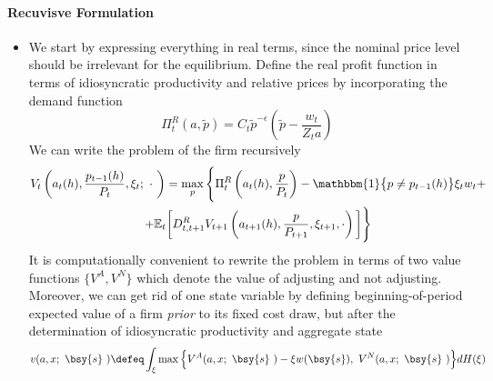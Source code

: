 \documentclass[a4paper,10pt]{article}  %
\begin{document}
\paragraph{Recuvisve Formulation} %
\label{par:recuvisve_formulation}
\begin{itemize}[label=\raisebox{0.50ex}{\tiny$\bullet$}]
   \item We start by expressing everything in real terms, since the nominal price level should be irrelevant for 
   the equilibrium. Define the real profit function in terms of idiosyncratic productivity and relative prices by
   incorporating the demand function
   \begin{equation}
      \label{eq:profit_function}
      \Pi^R_t (a, \tilde{p}) = C_t \tilde{p}^{-\epsilon} \left( \tilde{p} - \frac{w_t}{Z_t a}\right)
   \end{equation}
   We can write the problem of the firm recursively 
   \begin{multline}
      V_t \left( a_t(h), \frac{ p_{t-1}(h) }{ P_t }, \xi_t; \ \cdot \ \right) = 
      \max_{p} 
      \Bigg\{
         \Pi^R_t \left( a_t(h), \frac{ p }{ P_t } \right) 
         -\mathbbm{1} \big\{ p \ne p_{t-1}(h ) \big\} \xi_t  w_t + \\
         + \mathbb{E}_t \bigg[ D^R_{t,t+1} V_{t+1} \left( a_{t+1}(h), \frac{ p }{ P_{t+1} }, \xi_{t+1}, \cdot \right) \bigg] \Bigg\}
   \end{multline}
   It is computationally convenient to rewrite the problem in terms of two value functions $ \big\{V^A,V^N \big\} $
   which denote the value of adjusting and not adjusting. 
   Moreover, we can get rid of one state variable by defining beginning-of-period expected value of a firm \emph{prior}
   to its fixed cost draw, but after the determination of idiosyncratic productivity and aggregate state
   \begin{equation}
      \label{eq:value_fnc01}
      v(a, x; \ \bsy{s} \ ) \defeq \int_{\xi} \max \Big\{ V^A(a,x; \ \bsy{s} \ ) - \xi w(\bsy{s}) , \ V^N(a,x ; \ \bsy{s} \ )  \Big\} dH(\xi )

\end{equation}
\end{itemize}
\end{document}
